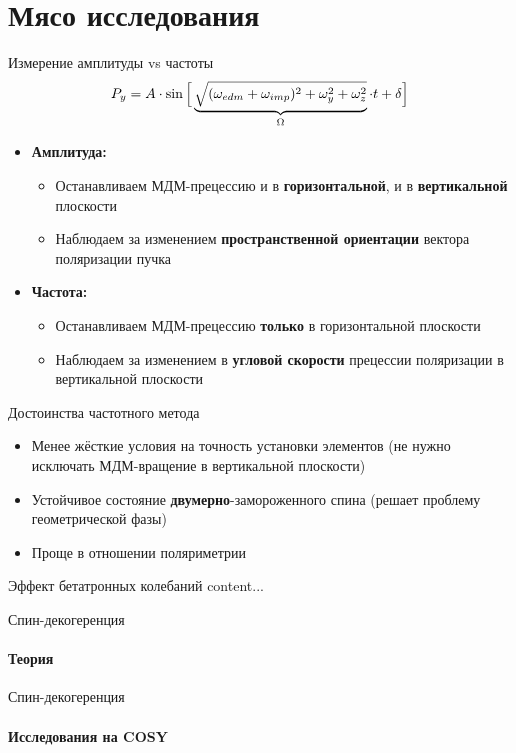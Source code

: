 \documentclass[14pt]{beamer}
\begin{document}
\section{Мясо исследования}
\begin{frame}{Измерение амплитуды vs частоты}
	\[
	P_y = A\cdot \sin\Big[\underbrace{\sqrt{(\omega_{edm} + \omega_{imp})^2 + \omega_y^2 + \omega_z^2}}_{\Omega}\cdot t + \delta\Big]
	\]
	\begin{itemize}
		\item \textbf{Амплитуда:} 
		\begin{itemize}
			\item Останавливаем МДМ-прецессию и в \textbf{горизонтальной}, и в \textbf{вертикальной} плоскости
			\item Наблюдаем за изменением \textbf{пространственной ориентации} вектора поляризации пучка
		\end{itemize}
		\item \textbf{Частота:}
		\begin{itemize}
			\item Останавливаем МДМ-прецессию \textbf{только} в горизонтальной плоскости
			\item Наблюдаем за изменением в \textbf{угловой скорости} прецессии поляризации в вертикальной плоскости
		\end{itemize}
	\end{itemize}
\end{frame}

\begin{frame}{Достоинства частотного метода}
	\begin{itemize}
		\item Менее жёсткие условия на точность установки элементов (не нужно исключать МДМ-вращение в вертикальной плоскости)
		\item Устойчивое состояние \textbf{двумерно}-замороженного спина (решает проблему геометрической фазы)
		\item Проще в отношении поляриметрии
	\end{itemize}
\end{frame}

\begin{frame}{Эффект бетатронных колебаний}
	content...
\end{frame}

\begin{frame}{Спин-декогеренция}
	\framesubtitle{Теория}
\end{frame}

\begin{frame}{Спин-декогеренция}
	\framesubtitle{Исследования на COSY}
\end{frame}
\end{document}
